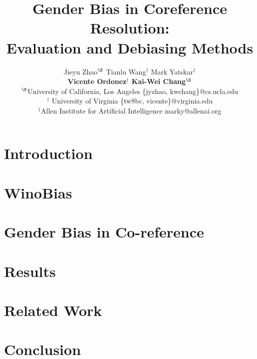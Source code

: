 \documentclass[11pt,a4paper]{article}
\title{Gender Bias in Coreference Resolution:\\ Evaluation and Debiasing Methods}
\author{Jieyu Zhao$^\S$ \qquad
 Tianlu Wang$^\dagger$ \qquad 
  Mark Yatskar$^\ddag$   \\
{\bf Vicente Ordonez$^\dagger$ \qquad
 Kai-Wei Chang$^\S$}
\\
  $^\S$University of California, Los Angeles \qquad
  \{jyzhao, kwchang\}@cs.ucla.edu \\
  $^\dagger$ University of Virginia \qquad 
  \{tw8bc, vicente\}@virginia.edu 
  \\ $^\ddag$Allen Institute for Artificial Intelligence \qquad marky@allenai.org
}
\date{}
\newcommand{\dataset}{WinoBias}
\begin{document}
\maketitle

\section{Introduction}
\label{sec:introduction}



% 


\section{\dataset}
\label{sec:calibrating_bias}


\section{Gender Bias in Co-reference}
\label{sec:visualizing_bias}


\section{Results}
\label{sec:results}
%


\section{Related Work}


\section{Conclusion}
\label{sec:conclusion}


%
%



% 


\end{document}
